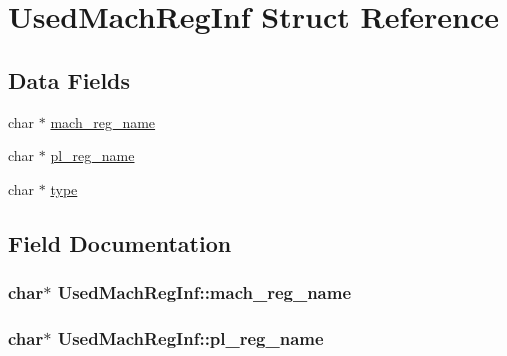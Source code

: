 \hypertarget{structUsedMachRegInf}{}\section{Used\+Mach\+Reg\+Inf Struct Reference}
\label{structUsedMachRegInf}
\subsection*{Data Fields}
\begin{DoxyCompactItemize}
\item 
char $\ast$ \hyperlink{structUsedMachRegInf_a469dabfeaa37fca00d87667d4dacc064}{mach\+\_\+reg\+\_\+name}
\item 
char $\ast$ \hyperlink{structUsedMachRegInf_a9a0e95f20d942e8610a0e905bafc7353}{pl\+\_\+reg\+\_\+name}
\item 
char $\ast$ \hyperlink{structUsedMachRegInf_a2e0c08014802409c0a340c61fab7dafe}{type}
\end{DoxyCompactItemize}


\subsection{Field Documentation}
\subsubsection[{\texorpdfstring{mach\+\_\+reg\+\_\+name}{mach_reg_name}}]{\setlength{\rightskip}{0pt plus 5cm}char$\ast$ Used\+Mach\+Reg\+Inf\+::mach\+\_\+reg\+\_\+name}\hypertarget{structUsedMachRegInf_a469dabfeaa37fca00d87667d4dacc064}{}\label{structUsedMachRegInf_a469dabfeaa37fca00d87667d4dacc064}
\subsubsection[{\texorpdfstring{pl\+\_\+reg\+\_\+name}{pl_reg_name}}]{\setlength{\rightskip}{0pt plus 5cm}char$\ast$ Used\+Mach\+Reg\+Inf\+::pl\+\_\+reg\+\_\+name}\hypertarget{structUsedMachRegInf_a9a0e95f20d942e8610a0e905bafc7353}{}\label{structUsedMachRegInf_a9a0e95f20d942e8610a0e905bafc7353}

